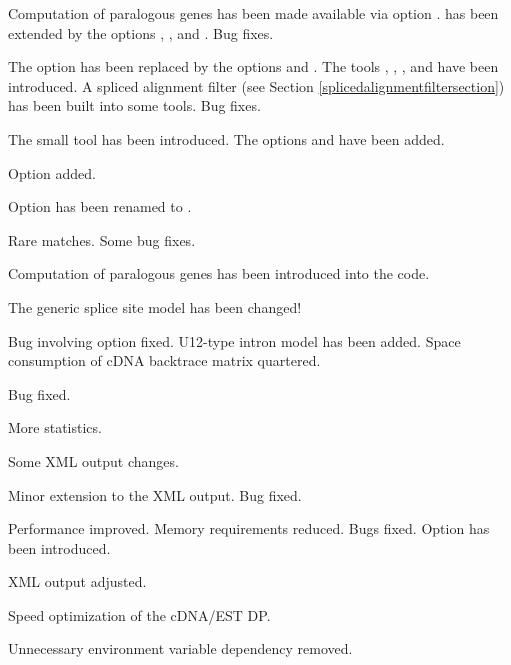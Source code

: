\documentclass[11pt,a4paper,titlepage]{article}
\begin{document}
Computation of paralogous genes has been made available via option
.  \Callgthgetseq has been extended by the options
, , and
. Bug fixes.

The option  has been replaced by the options  and
. The tools \Callgthsplit, \Callgthsplittwodim,
\Callgthgetseq, and \Callgthfilestat have been introduced. A spliced
alignment filter (see Section \ref{splicedalignmentfiltersection}) has been built into some \Gth tools. Bug fixes.

 The small tool \Callgthbssmfileinfo has been introduced. The options  and  have been added. 

 Option  added.

 Option  has been renamed to .

 Rare matches. Some bug fixes.

 Computation of paralogous genes has been introduced into the code.

 The generic splice site model has been changed! 

 Bug involving option  fixed. U12-type intron model has been added. Space consumption of cDNA backtrace matrix quartered.

 Bug fixed.

 More statistics. 

 Some XML output changes. 

 Minor extension to the XML output. Bug fixed.

 Performance improved. Memory requirements reduced. Bugs fixed. Option  has been introduced.

 XML output adjusted.

 Speed optimization of the cDNA/EST DP.

 Unnecessary environment variable dependency removed.
\end{document}
